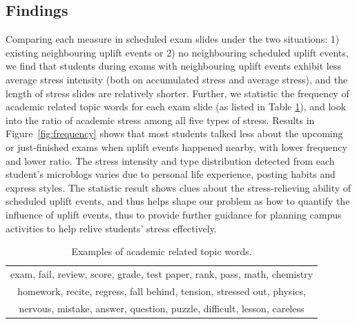 \subsection{Findings}
Comparing each measure in scheduled exam slides under the two situations: 1) existing neighbouring uplift events or 2) no neighbouring scheduled uplift events,
we find that students during exams with neighbouring uplift events exhibit less average stress intensity (both on accumulated stress and average stress),
and the length of stress slides are relatively shorter.
Further, we statistic the frequency of academic related topic words for each exam slide (as listed in Table \ref{tab:studyWords}),
and look into the ratio of academic stress among all five types of stress.
Results in Figure~\ref{fig:frequency} shows that most students talked less about the upcoming or just-finished exams when uplift events happened nearby,
with lower frequency and lower ratio.
The stress intensity and type distribution detected from each student's microblogs varies due to personal life experience, posting habits and express styles.
The statistic result shows clues about the stress-relieving ability of scheduled uplift events,
and thus helps shape our problem as how to quantify the influence of uplift events,
thus to provide further guidance for planning campus activities to help relive students' stress effectively.

\begin{table}[h]
\centering
\caption{\small{Examples of academic related topic words.}}
\label{tab:studyWords}
\small{
\begin{tabular}{c}
\toprule
exam, fail, review, score, grade, test paper, rank, pass, math, chemistry\\
homework, recite, regress, fall behind, tension, stressed out, physics,\\
nervous, mistake, answer, question, puzzle, difficult, lesson, careless\\
\bottomrule
\end{tabular}
}
\end{table}


